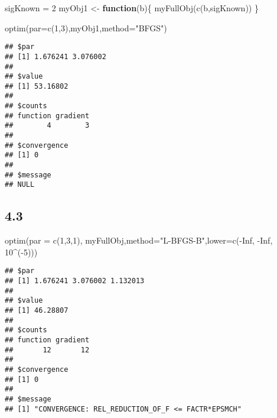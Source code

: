 \documentclass[
  11pt,
]{article}
\newenvironment{Shaded}{\begin{snugshade}}{\end{snugshade}}
\newcommand{\AttributeTok}[1]{\textcolor[rgb]{0.77,0.63,0.00}{#1}}
\newcommand{\ConstantTok}[1]{\textcolor[rgb]{0.00,0.00,0.00}{#1}}
\newcommand{\ControlFlowTok}[1]{\textcolor[rgb]{0.13,0.29,0.53}{\textbf{#1}}}
\newcommand{\DecValTok}[1]{\textcolor[rgb]{0.00,0.00,0.81}{#1}}
\newcommand{\FunctionTok}[1]{\textcolor[rgb]{0.00,0.00,0.00}{#1}}
\newcommand{\NormalTok}[1]{#1}
\newcommand{\OtherTok}[1]{\textcolor[rgb]{0.56,0.35,0.01}{#1}}
\newcommand{\SpecialCharTok}[1]{\textcolor[rgb]{0.00,0.00,0.00}{#1}}
\newcommand{\StringTok}[1]{\textcolor[rgb]{0.31,0.60,0.02}{#1}}
\begin{document}
\begin{Shaded}
\begin{Highlighting}[]
\NormalTok{sigKnown }\OtherTok{=} \DecValTok{2}
\NormalTok{myObj1 }\OtherTok{\textless{}{-}} \ControlFlowTok{function}\NormalTok{(b)\{}
  \FunctionTok{myFullObj}\NormalTok{(}\FunctionTok{c}\NormalTok{(b,sigKnown))}
\NormalTok{\}}

\FunctionTok{optim}\NormalTok{(}\AttributeTok{par=}\FunctionTok{c}\NormalTok{(}\DecValTok{1}\NormalTok{,}\DecValTok{3}\NormalTok{),myObj1,}\AttributeTok{method=}\StringTok{"BFGS"}\NormalTok{)}
\end{Highlighting}
\end{Shaded}

\begin{verbatim}
## $par
## [1] 1.676241 3.076002
## 
## $value
## [1] 53.16802
## 
## $counts
## function gradient 
##        4        3 
## 
## $convergence
## [1] 0
## 
## $message
## NULL
\end{verbatim}

\hypertarget{section-5}{%
\subsection{4.3}\label{section-5}}

\begin{Shaded}
\begin{Highlighting}[]
\FunctionTok{optim}\NormalTok{(}\AttributeTok{par =} \FunctionTok{c}\NormalTok{(}\DecValTok{1}\NormalTok{,}\DecValTok{3}\NormalTok{,}\DecValTok{1}\NormalTok{), myFullObj,}\AttributeTok{method=}\StringTok{"L{-}BFGS{-}B"}\NormalTok{,}\AttributeTok{lower=}\FunctionTok{c}\NormalTok{(}\SpecialCharTok{{-}}\ConstantTok{Inf}\NormalTok{, }\SpecialCharTok{{-}}\ConstantTok{Inf}\NormalTok{, }\DecValTok{10}\SpecialCharTok{\^{}}\NormalTok{(}\SpecialCharTok{{-}}\DecValTok{5}\NormalTok{)))}
\end{Highlighting}
\end{Shaded}

\begin{verbatim}
## $par
## [1] 1.676241 3.076002 1.132013
## 
## $value
## [1] 46.28807
## 
## $counts
## function gradient 
##       12       12 
## 
## $convergence
## [1] 0
## 
## $message
## [1] "CONVERGENCE: REL_REDUCTION_OF_F <= FACTR*EPSMCH"
\end{verbatim}
\end{document}
